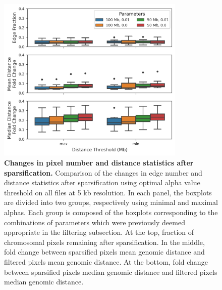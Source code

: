 \begin{figure}[ht]
  \centering
  \includegraphics[width=0.8\textwidth]{sparsification_stats.png}
  \caption{\textbf{Changes in pixel number and distance statistics after sparsification.} Comparison of the changes in edge number and distance statistics after sparsification using optimal alpha value threshold on all files at 5 kb resolution. In each panel, the boxplots are divided into two groups, respectively using minimal and maximal alphas. Each group is composed of the boxplots corresponding to the combinations of parameters which were previously deemed appropriate in the filtering subsection. At the top, fraction of chromosomal pixels remaining after sparsification. In the middle, fold change between sparsified pixels mean genomic distance and filtered pixels mean genomic distance. At the bottom, fold change between sparsified pixels median genomic distance and filtered pixels median genomic distance.}
  \label{fig:sparsification}
\end{figure}



